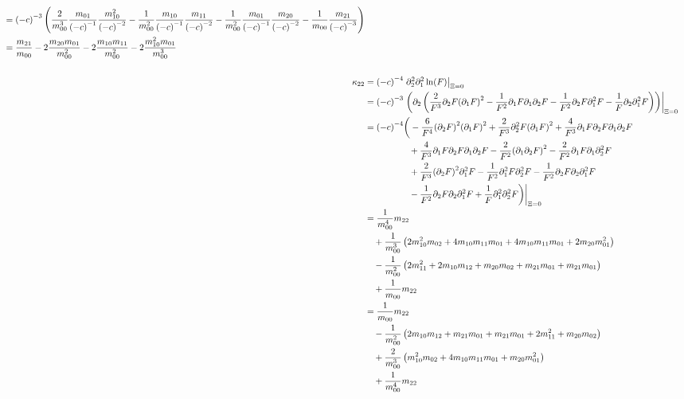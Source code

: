 \documentclass{article}
\begin{document}
\begin{align*}
\begin{aligned}
  & = {(-c)}^{-3} \left(
      \frac{2}{m_{00}^3} \frac{m_{01}}{{(-c)}^{-1}} \frac{m_{10}^2}{{(-c)}^{-2}}
    - \frac{1}{m_{00}^2} \frac{m_{10}}{{(-c)}^{-1}} \frac{m_{11}}{{(-c)}^{-2}}
    - \frac{1}{m_{00}^2} \frac{m_{01}}{{(-c)}^{-1}} \frac{m_{20}}{{(-c)}^{-2}}
    - \frac{1}{m_{00}}   \frac{m_{21}}{{(-c)}^{-3}}
    \right)\\
  & = \frac{m_{21}}{m_{00}} - 2\frac{m_{20}m_{01}}{m_{00}^2}
       - 2\frac{m_{10}m_{11}}{m_{00}^2} - 2\frac{m_{10}^2 m_{01}}{m_{00}^3}
  \end{aligned}\\
  \\
  &\begin{aligned}
  \nonumber
  \mathllap{\kappa_{22}} & = {(-c)}^{-4} \left. \partial_2^2 \partial_1^2 \ln(F) \right|_{\Xi = 0} \\
  & = {(-c)}^{-3} \left.\left(\partial_2\left(
      \frac{2}{F^3} \partial_2 F {(\partial_1 F)}^2
    - \frac{1}{F^2} \partial_1 F \partial_1 \partial_2 F
    - \frac{1}{F^2} \partial_2 F \partial_1^2 F
    - \frac{1}{F} \partial_2 \partial_1^2 F
    \right)\right)\right|_{\Xi = 0}\\
  & = {(-c)}^{-4} \bigg(
    - \frac{6}{F^4} {(\partial_2 F)}^2 {(\partial_1 F)}^2
    + \frac{2}{F^3} \partial_2^2 F {(\partial_1 F)}^2
    + \frac{4}{F^3} \partial_1 F \partial_2 F \partial_1 \partial_2 F \\
  & \qquad\qquad\quad
    + \frac{4}{F^3} \partial_1 F \partial_2 F \partial_1 \partial_2 F
    - \frac{2}{F^2} {(\partial_1 \partial_2 F)}^2
    - \frac{2}{F^2} \partial_1 F \partial_1 \partial_2^2 F \\
  & \qquad\qquad\quad
    + \frac{2}{F^3} {(\partial_2 F)}^2  \partial_1^2 F
    - \frac{1}{F^2} \partial_1^2 F \partial_2^2 F
    - \frac{1}{F^2} \partial_2 F \partial_2 \partial_1^2 F \\
  & \qquad\qquad\quad
    - \frac{1}{F^2} \partial_2 F \partial_2 \partial_1^2 F
    + \frac{1}{F}   \partial_1^2 \partial_2^2 F
    \bigg)\bigg|_{\Xi = 0} \\
  & = \frac{1}{m_{00}^4} m_{22} \\
  &\quad
    + \frac{1}{m_{00}^3}
      \left(
        2 m_{10}^2 m_{02} + 4 m_{10}m_{11}m_{01}
        + 4 m_{10}m_{11}m_{01} + 2 m_{20}m_{01}^2
      \right) \\
  &\quad
    - \frac{1}{m_{00}^2}
      \left(
        2 m_{11}^2 + 2 m_{10}m_{12} + m_{20}m_{02} + m_{21}m_{01} + m_{21}m_{01}
      \right) \\
  &\quad
    + \frac{1}{m_{00}} m_{22}\\
  & = \frac{1}{m_{00}} m_{22} \\
    &\quad
    - \frac{1}{m_{00}^2}
    \left(
       2 m_{10}m_{12}  + m_{21}m_{01} + m_{21}m_{01} + 2 m_{11}^2 + m_{20}m_{02}
    \right) \\
    &\quad
    + \frac{2}{m_{00}^3}
      \left(
        m_{10}^2 m_{02} + 4 m_{10}m_{11}m_{01} + m_{20}m_{01}^2
      \right)\\
    &\quad
       + \frac{1}{m_{00}^4} m_{22}
  \end{aligned}
\end{align*}
\end{document}
